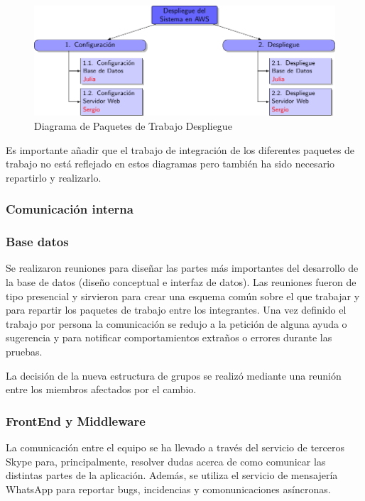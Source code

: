 \begin{figure}[H]
		\centering
		\includegraphics[scale=0.8]{figuras/edtDespliegue.pdf}
		\caption{Diagrama de Paquetes de Trabajo Despliegue}
	\end{figure}

Es importante añadir que el trabajo de integración de los diferentes paquetes de trabajo no está reflejado en estos diagramas pero también ha sido necesario repartirlo y realizarlo.
\subsubsection{Comunicación interna}
\subsubsection*{Base datos}
Se realizaron reuniones para diseñar las partes más importantes del desarrollo de la base de datos (diseño conceptual e interfaz de datos). Las reuniones fueron de tipo presencial y sirvieron para crear una esquema común sobre el que trabajar y para repartir los paquetes de trabajo entre los integrantes. Una vez definido el trabajo por persona la comunicación se redujo a la petición de alguna ayuda o sugerencia y para notificar comportamientos extraños o errores durante las pruebas.

La decisión de la nueva estructura de grupos se realizó mediante una reunión entre los miembros afectados por el cambio.
\subsubsection*{FrontEnd y Middleware}
La comunicación entre el equipo se ha llevado a través del servicio de terceros Skype para, principalmente, resolver dudas acerca de como comunicar las distintas partes de la aplicación. Además, se utiliza el servicio de mensajería WhatsApp para reportar bugs, incidencias y comonunicaciones asíncronas.
